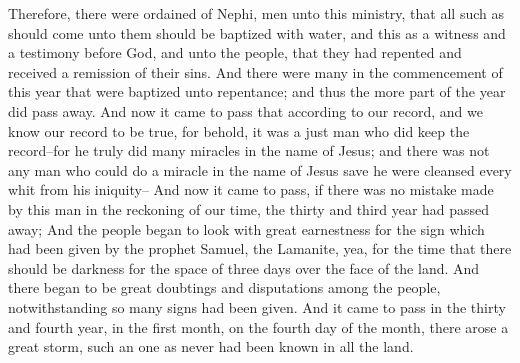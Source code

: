 Therefore, there were ordained of Nephi, men unto this ministry, that all such as should come unto them should be baptized with water, and this as a witness and a testimony before God, and unto the people, that they had repented and received a remission of their sins.
\bverse \iffalse And there were many in the commencement of this year that were baptized unto repentance; and thus the more part of the year did pass away. \fi
And there were many in the commencement of this year that were baptized unto repentance; and thus the more part of the year did pass away.
\bchapter
\bverse \iffalse And now it came to pass that according to our record, and we know our record to be true, for behold, it was a just man who did keep the record--for he truly did many miracles in the name of Jesus; and there was not any man who could do a miracle in the name of Jesus save he were cleansed every whit from his iniquity-- \fi
And now it came to pass that according to our record, and we know our record to be true, for behold, it was a just man who did keep the record--for he truly did many miracles in the name of Jesus; and there was not any man who could do a miracle in the name of Jesus save he were cleansed every whit from his iniquity--
\bverse \iffalse And now it came to pass, if there was no mistake made by this man in the reckoning of our time, the thirty and third year had passed away; \fi
And now it came to pass, if there was no mistake made by this man in the reckoning of our time, the thirty and third year had passed away;
\bverse \iffalse And the people began to look with great earnestness for the sign which had been given by the prophet Samuel, the Lamanite, yea, for the time that there should be darkness for the space of three days over the face of the land. \fi
And the people began to look with great earnestness for the sign which had been given by the prophet Samuel, the Lamanite, yea, for the time that there should be darkness for the space of three days over the face of the land.
\bverse \iffalse And there began to be great doubtings and disputations among the people, notwithstanding so many signs had been given. \fi
And there began to be great doubtings and disputations among the people, notwithstanding so many signs had been given.
\bverse \iffalse And it came to pass in the thirty and fourth year, in the first month, on the fourth day of the month, there arose a great storm, such an one as never had been known in all the land. \fi
And it came to pass in the thirty and fourth year, in the first month, on the fourth day of the month, there arose a great storm, such an one as never had been known in all the land.
